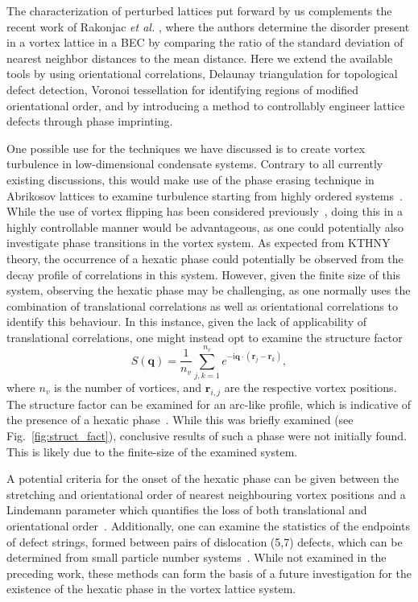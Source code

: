 The characterization of perturbed lattices put forward by us complements the recent work of Rakonjac \textit{et al.} \cite{VTX:Rankonjac_pra_2016}, where the authors determine the disorder present in a vortex lattice in a BEC by comparing the ratio of the standard deviation of nearest neighbor distances to the mean distance. Here we extend the available tools by using orientational correlations, Delaunay triangulation for topological defect detection, Voronoi tessellation for identifying regions of modified orientational order, and by introducing a method to controllably engineer lattice defects through phase imprinting.

One possible use for the techniques we have discussed is to create vortex turbulence in low-dimensional condensate systems. Contrary to all currently existing discussions, this would make use of the phase erasing technique in Abrikosov lattices to examine turbulence starting from highly ordered systems~\cite{VTX:Neely_prl_2013,VTX:Kwon_pra_2014,VTX:Groszek_pra_2016}. While the use of vortex flipping has been considered previously~\cite{VTX:Madarassy_gfd_2009}, doing this in a highly controllable manner would be advantageous, as one could potentially also investigate phase transitions in the vortex system. As expected from KTHNY theory, the occurrence of a hexatic phase could potentially be observed from the decay profile of correlations in this system. However, given the finite size of this system, observing the hexatic phase may be challenging, as one normally uses the combination of translational correlations as well as orientational correlations to identify this behaviour. In this instance, given the lack of applicability of translational correlations, one might instead opt to examine the structure factor \[S(\mathbf{q}) = \frac{1}{n_v}\displaystyle\sum\limits_{j,k=1}^{n_v} e^{-\textrm{i}\mathbf{q}\cdot(\mathbf{r}_j - \mathbf{r}_k)},\] where $n_v$ is the number of vortices, and $\mathbf{r}_{i,j}$ are the respective vortex positions. The structure factor can be examined for an arc-like profile, which is indicative of the presence of a hexatic phase~\cite{CM:Brodin_cmp_2010,CM:Sun_scirep_2016}. While this was briefly examined (see Fig.~\ref{fig:struct_fact}), conclusive results of such a phase were not initially found. This is likely due to the finite-size of the examined system.

A potential criteria for the onset of the hexatic phase can be given between the stretching and orientational order of nearest neighbouring vortex positions and a Lindemann parameter which quantifies the loss of both translational and orientational order~\cite{CM:Bruun_prb_2014}. Additionally, one can examine the statistics of the endpoints of defect strings, formed between pairs of dislocation (5,7) defects, which can be determined from small particle number systems~\cite{CM:Lechner_prl_2014}. While not examined in the preceding work, these methods can form the basis of a future investigation for the existence of the hexatic phase in the vortex lattice system.

